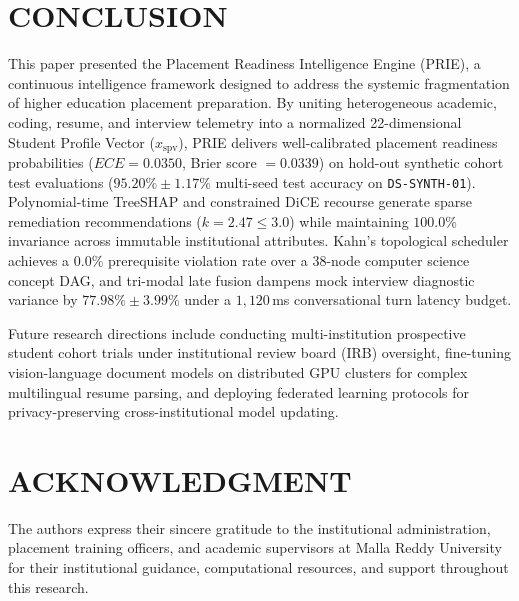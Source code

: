 \documentclass[conference]{IEEEtran}
\begin{document}
\section{CONCLUSION}

This paper presented the Placement Readiness Intelligence Engine (PRIE), a continuous intelligence framework designed to address the systemic fragmentation of higher education placement preparation. By uniting heterogeneous academic, coding, resume, and interview telemetry into a normalized 22-dimensional Student Profile Vector ($x_{\text{spv}}$), PRIE delivers well-calibrated placement readiness probabilities ($ECE = 0.0350$, Brier score $= 0.0339$) on hold-out synthetic cohort test evaluations ($95.20\% \pm 1.17\%$ multi-seed test accuracy on \texttt{DS-SYNTH-01}). Polynomial-time TreeSHAP and constrained DiCE recourse generate sparse remediation recommendations ($k = 2.47 \le 3.0$) while maintaining $100.0\%$ invariance across immutable institutional attributes. Kahn's topological scheduler achieves a $0.0\%$ prerequisite violation rate over a 38-node computer science concept DAG, and tri-modal late fusion dampens mock interview diagnostic variance by $77.98\% \pm 3.99\%$ under a $1,120$\,ms conversational turn latency budget.

Future research directions include conducting multi-institution prospective student cohort trials under institutional review board (IRB) oversight, fine-tuning vision-language document models on distributed GPU clusters for complex multilingual resume parsing, and deploying federated learning protocols for privacy-preserving cross-institutional model updating.

\section*{ACKNOWLEDGMENT}

The authors express their sincere gratitude to the institutional administration, placement training officers, and academic supervisors at Malla Reddy University for their institutional guidance, computational resources, and support throughout this research.
\end{document}

